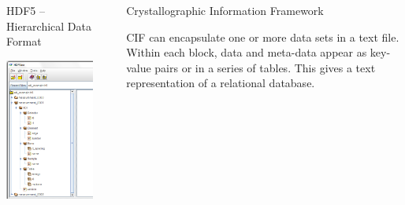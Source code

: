 \documentclass[final]{beamer}
\begin{document}
\begin{frame}{}
\begin{columns}[t]
\begin{column}{.31\linewidth}
\begin{block}{HDF5 -- Hierarchical Data Format}
         \begin{center}
           \includegraphics[width=0.51\linewidth]{hdf5.png}
         \end{center}

         \vspace{10mm} {\ }   \vspace{10mm} {\ }

        \end{block}
      \end{column}
      \begin{column}{.01\linewidth}
      \end{column}
      \begin{column}{.34\linewidth}
        \begin{block}{Crystallographic Information Framework}

          \justifying CIF can encapsulate one or more data sets in a text
          file.  Within each block, data and meta-data appear as key-value
          pairs or in a series of tables.  This gives a text representation
          of a relational database.


\end{block}
\end{column}
\end{columns}
\end{frame}
\end{document}
